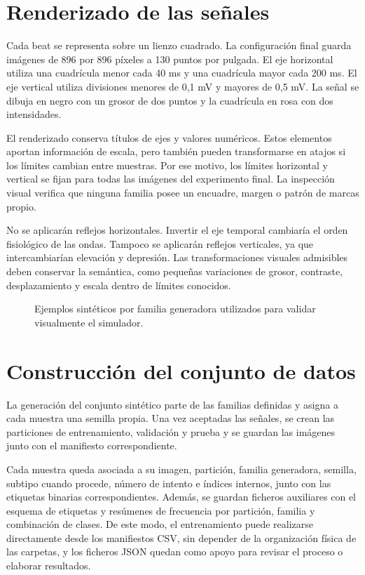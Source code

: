 \section{Renderizado de las señales}

Cada beat se representa sobre un lienzo cuadrado. La configuración final guarda imágenes de 896 por 896 píxeles a 130 puntos por pulgada. El eje horizontal utiliza una cuadrícula menor cada 40 ms y una cuadrícula mayor cada 200 ms. El eje vertical utiliza divisiones menores de 0,1 mV y mayores de 0,5 mV. La señal se dibuja en negro con un grosor de dos puntos y la cuadrícula en rosa con dos intensidades.

El renderizado conserva títulos de ejes y valores numéricos. Estos elementos aportan información de escala, pero también pueden transformarse en atajos si los límites cambian entre muestras. Por ese motivo, los límites horizontal y vertical se fijan para todas las imágenes del experimento final. La inspección visual verifica que ninguna familia posee un encuadre, margen o patrón de marcas propio.

No se aplicarán reflejos horizontales. Invertir el eje temporal cambiaría el orden fisiológico de las ondas. Tampoco se aplicarán reflejos verticales, ya que intercambiarían elevación y depresión. Las transformaciones visuales admisibles deben conservar la semántica, como pequeñas variaciones de grosor, contraste, desplazamiento y escala dentro de límites conocidos.

\begin{figure}[H]
  \centering
  \caption{Ejemplos sintéticos por familia generadora utilizados para validar visualmente el simulador.}
  \label{fig:synthetic_examples}
\end{figure}

\section{Construcción del conjunto de datos}

La generación del conjunto sintético parte de las familias definidas y asigna a cada muestra una semilla propia. Una vez aceptadas las señales, se crean las particiones de entrenamiento, validación y prueba y se guardan las imágenes junto con el manifiesto correspondiente.

Cada muestra queda asociada a su imagen, partición, familia generadora, semilla, subtipo cuando procede, número de intento e índices internos, junto con las etiquetas binarias correspondientes. Además, se guardan ficheros auxiliares con el esquema de etiquetas y resúmenes de frecuencia por partición, familia y combinación de clases. De este modo, el entrenamiento puede realizarse directamente desde los manifiestos CSV, sin depender de la organización física de las carpetas, y los ficheros JSON quedan como apoyo para revisar el proceso o elaborar resultados.

